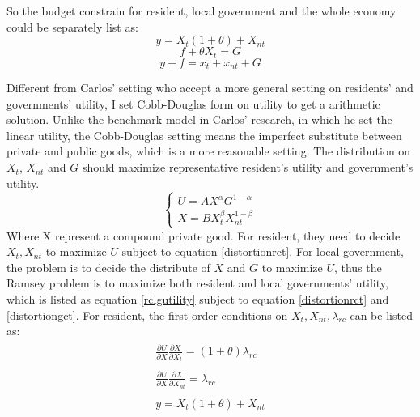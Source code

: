 So the budget constrain for resident, local government and the whole economy could be separately list as:
\begin{equation} \label{distortionrct}
    y=X_t(1+\theta)+X_{n t}
\end{equation}
\begin{equation} \label{distortiongct}
    f+\theta X_t=G
\end{equation}
\begin{equation} \label{distortionect}
    y+f=x_t+x_{nt}+G
\end{equation}

Different from Carlos' setting who accept a more general setting on residents' and governments' utility, I set Cobb-Douglas form on utility to get a arithmetic solution. Unlike the benchmark model in Carlos' research, in which he set the linear utility, the Cobb-Douglas setting means the imperfect substitute between private and public goods, which is a more reasonable setting. The distribution on $X_t$, $X_{nt}$ and $G$ should maximize representative resident's utility and government's utility.
\begin{equation} \label{rclgutility}
    \left\{\begin{array}{l}U=A X^\alpha G^{1-\alpha} \\ X=B X_t^\beta X_{n t}^{1-\beta}\end{array}\right.
\end{equation}
Where X represent a compound private good.
For resident, they need to decide $X_t, X_{nt}$ to maximize $U$ subject to equation \ref{distortionrct}. For local government, the problem is to decide the distribute of $X$ and $G$ to maximize $U$, thus the Ramsey problem is to maximize both resident and local governments' utility, which is listed as equation \ref*{rclgutility} subject to equation \ref{distortionrct} and \ref{distortiongct}. For resident, the first order conditions on $X_t, X_{nt}, \lambda_{rc}$ can be listed as:
\begin{align}
    \begin{split}
        \frac{\partial U}{\partial X} \frac{\partial X}{\partial X_t}=(1+\theta) \lambda_{r c} \label{focxt}
    \end{split}                     \\
    \begin{split}
        \frac{\partial U}{\partial X} \frac{\partial X}{\partial X_{nt}}=\lambda_{r c} \label{focxnt}
    \end{split} \\
    \begin{split}
        y=X_t(1+\theta)+X_{nt} \label{foclabrc}
    \end{split}
\end{align}
